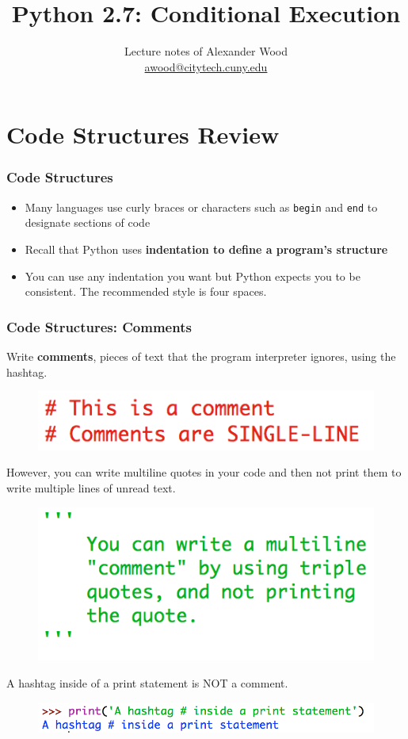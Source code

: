 \documentclass{beamer}
\title[Conditional Execution]{Python 2.7: Conditional Execution}
\author
{Lecture notes of Alexander Wood \\ \scriptsize \href{mailto:awood@citytech.cuny.edu}{awood@citytech.cuny.edu}}
\institute[CityTech]{New York City College of Technology }
\date{}
\begin{document}
\begin{frame}
\titlepage
\end{frame}

\section{Code Structures Review}

\begin{frame}[fragile]
\frametitle{Code Structures}

\begin{itemize}
\item Many languages use curly braces or characters such as \verb|begin| and \verb|end| to designate sections of code
\item Recall that Python uses \textbf{indentation to define a program's structure}
\item You can use any indentation you want but Python expects you to be consistent. The recommended style is four spaces.
\end{itemize}
\end{frame}

\begin{frame}
\frametitle{Code Structures: Comments}

Write \textbf{comments}, pieces of text that the program interpreter ignores, using the hashtag. 
\begin{figure}
\centering
\includegraphics[scale=.5]{IMG/1.png}
\end{figure}
However, you can write multiline quotes in your code and then not print them to write multiple lines of unread text.
\begin{figure}
\centering
\includegraphics[scale=.4]{IMG/2.png}
\end{figure}
A hashtag inside of a print statement is NOT a comment.
\begin{figure}
\centering
\includegraphics[scale=.5]{IMG/3.png}
\end{figure}
\end{frame}
\end{document}
